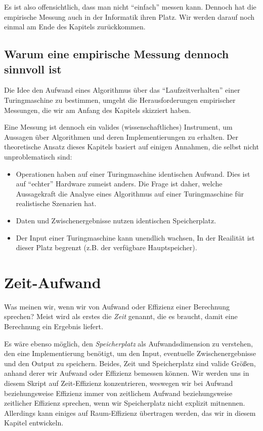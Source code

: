 Es ist also offensichtlich,
dass man nicht ``einfach'' messen kann.
Dennoch hat die empirische Messung auch in der Informatik ihren Platz.
Wir werden darauf noch einmal am Ende des Kapitels zurückkommen.

\subsection{Warum eine empirische Messung dennoch sinnvoll ist}
Die Idee den Aufwand eines Algorithmus über das ``Laufzeitverhalten'' einer Turingmaschine zu bestimmen,
umgeht die Herausforderungen empirischer Messungen, die wir am Anfang des Kapitels skizziert haben.

Eine Messung ist dennoch ein valides (wissenschaftliches) Instrument,
um Aussagen über Algorithmen und deren Implementierungen zu erhalten.
Der theoretische Ansatz dieses Kapitels basiert auf einigen Annahmen,
die selbst nicht unproblematisch sind:
\begin{itemize}
  \item Operationen haben auf einer Turingmaschine identischen Aufwand.
    Dies ist auf ``echter'' Hardware zumeist anders.
    Die Frage ist daher, welche Aussagekraft die Analyse eines Algorithmus auf einer Turingmaschine für realistische Szenarien hat.
  \item Daten und Zwischenergebnisse nutzen identischen Speicherplatz.
  \item Der Input einer Turingmaschine kann unendlich wachsen,
      In der Reailität ist dieser Platz begrenzt (z.B. der verfügbare Hauptspeicher).
\end{itemize}

\section{Zeit-Aufwand}

Was meinen wir, wenn wir von Aufwand oder Effizienz einer Berechnung sprechen?
Meist wird als erstes die \emph{Zeit} genannt,
die es braucht,
damit eine Berechnung ein Ergebnis liefert.

Es wäre ebenso möglich,
den \emph{Speicherplatz} als Aufwandsdimension zu verstehen,
den eine Implementierung benötigt,
um den Input,
eventuelle Zwischenergebnisse
und den Output zu speichern.
Beides, Zeit und Speicherplatz sind valide Größen,
anhand derer wir Aufwand oder Effizienz bemessen können.
Wir werden uns in diesem Skript auf Zeit-Effizienz konzentrieren,
weswegen wir bei Aufwand beziehungsweise Effizienz immer von
zeitlichem Aufwand beziehungsweise zeitlicher Effizienz sprechen,
wenn wir Speicherplatz nicht explizit mitnennen.
Allerdings kann einiges auf Raum-Effizienz übertragen werden,
das wir in diesem Kapitel entwickeln.

